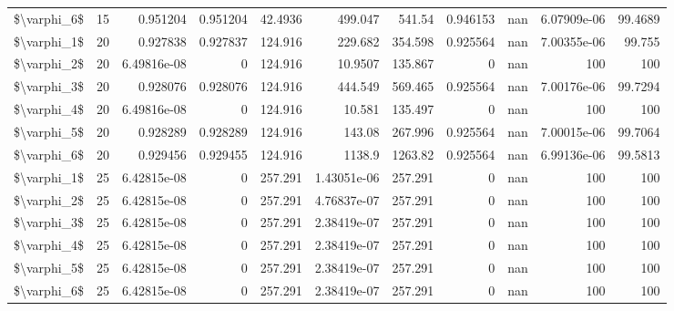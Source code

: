 \begin{tabular}{lrrrrrrrrrr}
 \$\textbackslash{}varphi\_6\$ &  15 & 0.951204    & 0.951204 &     42.4936 &  499.047       &     541.54   &     0.946153 &         nan &   6.07909e-06 &  99.4689      \\
 \$\textbackslash{}varphi\_1\$ &  20 & 0.927838    & 0.927837 &    124.916  &  229.682       &     354.598  &     0.925564 &         nan &   7.00355e-06 &  99.755       \\
 \$\textbackslash{}varphi\_2\$ &  20 & 6.49816e-08 & 0        &    124.916  &   10.9507      &     135.867  &     0        &         nan & 100           & 100           \\
 \$\textbackslash{}varphi\_3\$ &  20 & 0.928076    & 0.928076 &    124.916  &  444.549       &     569.465  &     0.925564 &         nan &   7.00176e-06 &  99.7294      \\
 \$\textbackslash{}varphi\_4\$ &  20 & 6.49816e-08 & 0        &    124.916  &   10.581       &     135.497  &     0        &         nan & 100           & 100           \\
 \$\textbackslash{}varphi\_5\$ &  20 & 0.928289    & 0.928289 &    124.916  &  143.08        &     267.996  &     0.925564 &         nan &   7.00015e-06 &  99.7064      \\
 \$\textbackslash{}varphi\_6\$ &  20 & 0.929456    & 0.929455 &    124.916  & 1138.9         &    1263.82   &     0.925564 &         nan &   6.99136e-06 &  99.5813      \\
 \$\textbackslash{}varphi\_1\$ &  25 & 6.42815e-08 & 0        &    257.291  &    1.43051e-06 &     257.291  &     0        &         nan & 100           & 100           \\
 \$\textbackslash{}varphi\_2\$ &  25 & 6.42815e-08 & 0        &    257.291  &    4.76837e-07 &     257.291  &     0        &         nan & 100           & 100           \\
 \$\textbackslash{}varphi\_3\$ &  25 & 6.42815e-08 & 0        &    257.291  &    2.38419e-07 &     257.291  &     0        &         nan & 100           & 100           \\
 \$\textbackslash{}varphi\_4\$ &  25 & 6.42815e-08 & 0        &    257.291  &    2.38419e-07 &     257.291  &     0        &         nan & 100           & 100           \\
 \$\textbackslash{}varphi\_5\$ &  25 & 6.42815e-08 & 0        &    257.291  &    2.38419e-07 &     257.291  &     0        &         nan & 100           & 100           \\
 \$\textbackslash{}varphi\_6\$ &  25 & 6.42815e-08 & 0        &    257.291  &    2.38419e-07 &     257.291  &     0        &         nan & 100           & 100           \\

\end{tabular}
